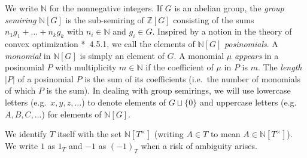 \documentclass[reqno]{amsart}
\theoremstyle{definition}
\newtheorem{Df}[Thm]{Definition}
\theoremstyle{remark}
\newcommand{\abs}[1]{\lvert #1 \rvert}
\newcommand{\del}{\backslash}
\newcommand{\Nc}{\mathcal{N}}
\begin{document}
    We write $\mathbb{N}$ for the nonnegative integers. If $G$ is an abelian group, the \emph{group semiring} 
    $\mathbb{N}[G]$ is the sub-semiring of $\mathbb{Z}[G]$ consisting of the sums 
    $n_1 g_1 + \dots + n_k g_k$ with $n_i \in \mathbb{N}$ and $g_i \in G$.
    Inspired by a notion in the theory of convex optimization \cite{boyd04}*{\textsection~4.5.1}, we call the elements of $\mathbb{N}[G]$ \emph{posinomials}. 
    A \emph{monomial} in $\mathbb{N}[G]$ is simply an element of $G$. A monomial $\mu$ \emph{appears} in a posinomial $P$ with multiplicity $m \in \mathbb{N}$ if the coefficient of $\mu$ in $P$ is $m$.
    The \emph{length} $\abs{P}$ of a posinomial $P$ is the sum of its coefficients (i.e.\ the number of monomials of which $P$ is the sum).
    In dealing with group semirings, we will use lowercase letters (e.g.\ $x,y,z,\dots$) to denote elements of $G \sqcup \{0\}$ and uppercase letters (e.g.\ $A, B, C,\dots$) for elements of $\mathbb{N}[G]$.
    We identify $T$ itself with the set $\mathbb{N}[T^{\times}]$ (writing $A \in T$ to mean $A \in \mathbb{N}[T^{\times}]$). We write $1$ as $1_T$ and $-1$ as $(-1)_T$ when a risk of ambiguity arises.
    
\end{document}
